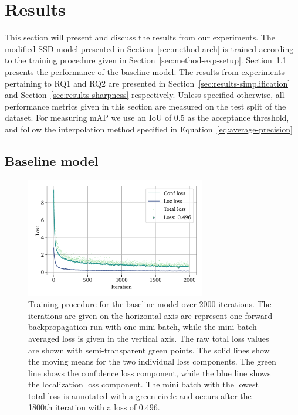 \chapter{Results}\label{cha:results}

This section will present and discuss the results from our experiments.
The modified SSD model presented in Section~\ref{sec:method-arch} is trained according to the training procedure given in Section~\ref{sec:method-exp-setup}.
Section~\ref{sec:results-baseline} presents the performance of the baseline model. 
The results from experiments pertaining to RQ1 and RQ2 are presented in Section~\ref{sec:results-simplification} and Section~\ref{sec:results-sharpness} respectively.
Unless specified otherwise, all performance metrics given in this section are measured on the test split of the dataset.
For measuring mAP we use an IoU of 0.5 as the acceptance threshold, and follow the interpolation method specified in Equation~\ref{eq:average-precision}

\section{Baseline model}\label{sec:results-baseline}
\begin{figure}[htbp]
    \centering
    \includegraphics[width=0.7\textwidth]{figs/results/baseline/loss2.pdf}
    \caption[Baseline training procedure]{%
Training procedure for the baseline model over 2000 iterations.
The iterations are given on the horizontal axis are represent one forward-backpropagation run with one mini-batch, while the mini-batch averaged loss is given in the vertical axis.
The raw total loss values are shown with semi-transparent green points.
The solid lines show the moving means for the two individual loss components.
The green line shows the confidence loss component, while the blue line shows the localization loss component.
The mini batch with the lowest total loss is annotated with a green circle and occurs after the 1800th iteration with a loss of 0.496.
    }\label{fig:method-baseline-loss}
  \end{figure}

